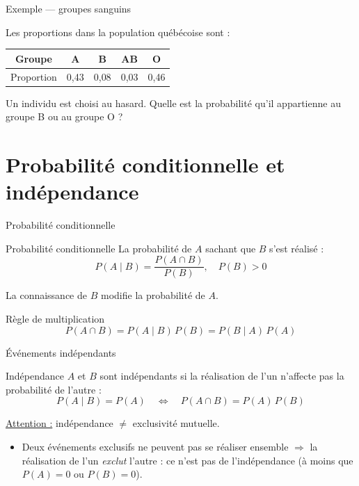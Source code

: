 \documentclass{BeamerTemplate}
\begin{document}
\begin{frame}[t]{Exemple — groupes sanguins}

Les proportions dans la population québécoise sont :

\begin{center}
\begin{tabular}{|c|c|c|c|c|}
\hline
Groupe & A & B & AB & O \\ \hline
Proportion & 0{,}43 & 0{,}08 & 0{,}03 & 0{,}46 \\ \hline
\end{tabular}
\end{center}

\bigskip
Un individu est choisi au hasard. Quelle est la probabilité qu'il appartienne au groupe B ou au groupe O ?


\end{frame}

\section{Probabilité conditionnelle et indépendance}

\begin{frame}[t]{Probabilité conditionnelle}

\begin{Boite}{Probabilité conditionnelle}
La probabilité de $A$ sachant que $B$ s'est réalisé :
$$P(A \mid B) = \frac{P(A \cap B)}{P(B)}, \quad P(B) > 0$$
\end{Boite}

\medskip
La connaissance de $B$ \alert{modifie} la probabilité de $A$.

\bigskip
\begin{Boite}{Règle de multiplication}
$$P(A \cap B) = P(A \mid B)\,P(B) = P(B \mid A)\,P(A)$$
\end{Boite}

\end{frame}

\begin{frame}[t]{Événements indépendants}

\begin{Boite}{Indépendance}
$A$ et $B$ sont indépendants si la réalisation de l'un n'affecte pas la probabilité de l'autre :
$$P(A \mid B) = P(A) \quad \Longleftrightarrow \quad P(A \cap B) = P(A)\,P(B)$$
\end{Boite}

\medskip
\underline{Attention :} indépendance $\neq$ exclusivité mutuelle.
\begin{itemize}\itemsep3mm
  \item Deux événements exclusifs ne peuvent pas se réaliser ensemble $\Rightarrow$ la réalisation de l'un \emph{exclut} l'autre : ce n'est pas de l'indépendance (à moins que $P(A)=0$ ou $P(B)=0$).
\end{itemize}

\end{frame}
\end{document}
